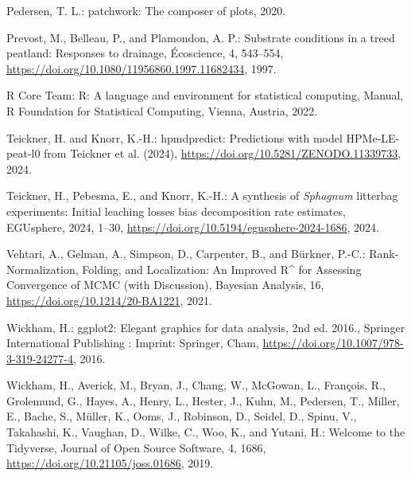 \documentclass[
  12pt,
]{article}
\newlength{\cslhangindent}
\newlength{\cslentryspacingunit} %
\newenvironment{CSLReferences}[2] %
 {%
  \setlength{\parindent}{0pt}
  \ifodd #1
  \let\oldpar\par
  \def\par{\hangindent=\cslhangindent\oldpar}
  \fi
  \setlength{\parskip}{#2\cslentryspacingunit}
 }%
 {}
\begin{document}
\begin{CSLReferences}{0}{0}
\leavevmode{}%
Pedersen, T. L.: {patchwork}: {The} composer of plots, 2020.

\leavevmode{}%
Prevost, M., Belleau, P., and Plamondon, A. P.: Substrate conditions in a treed peatland: {Responses} to drainage, {É}coscience, 4, 543--554, \url{https://doi.org/10.1080/11956860.1997.11682434}, 1997.

\leavevmode{}%
R Core Team: R: {A} language and environment for statistical computing, Manual, R Foundation for Statistical Computing, Vienna, Austria, 2022.

\leavevmode{}%
Teickner, H. and Knorr, K.-H.: {hpmdpredict}: {Predictions} with model {HPMe-LE-peat-l0} from {Teickner} et al. (2024), \url{https://doi.org/10.5281/ZENODO.11339733}, 2024.

\leavevmode{}%
Teickner, H., Pebesma, E., and Knorr, K.-H.: A synthesis of {\emph{Sphagnum}} litterbag experiments: {Initial} leaching losses bias decomposition rate estimates, EGUsphere, 2024, 1--30, \url{https://doi.org/10.5194/egusphere-2024-1686}, 2024.

\leavevmode{}%
Vehtari, A., Gelman, A., Simpson, D., Carpenter, B., and Bürkner, P.-C.: Rank-{Normalization}, {Folding}, and {Localization}: {An Improved R{\^{}}} for {Assessing Convergence} of {MCMC} (with {Discussion}), Bayesian Analysis, 16, \url{https://doi.org/10.1214/20-BA1221}, 2021.

\leavevmode{}%
Wickham, H.: {ggplot2}: {Elegant} graphics for data analysis, 2nd ed. 2016., Springer International Publishing : Imprint: Springer, Cham, \url{https://doi.org/10.1007/978-3-319-24277-4}, 2016.

\leavevmode{}%
Wickham, H., Averick, M., Bryan, J., Chang, W., McGowan, L., François, R., Grolemund, G., Hayes, A., Henry, L., Hester, J., Kuhn, M., Pedersen, T., Miller, E., Bache, S., Müller, K., Ooms, J., Robinson, D., Seidel, D., Spinu, V., Takahashi, K., Vaughan, D., Wilke, C., Woo, K., and Yutani, H.: Welcome to the {Tidyverse}, Journal of Open Source Software, 4, 1686, \url{https://doi.org/10.21105/joss.01686}, 2019.

\end{CSLReferences}
\end{document}
